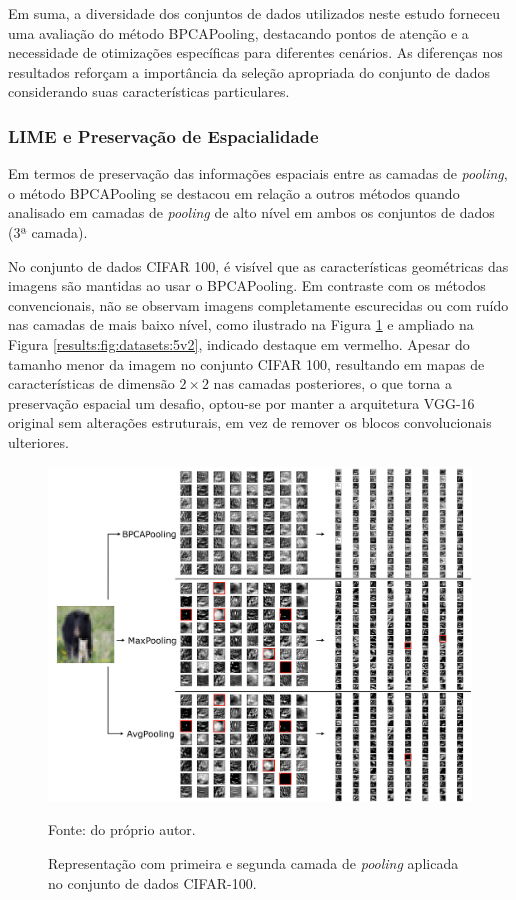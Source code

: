 Em suma, a diversidade dos conjuntos de dados utilizados neste estudo forneceu uma avaliação do método BPCAPooling, destacando pontos de atenção e a necessidade de otimizações específicas para diferentes cenários. As diferenças nos resultados reforçam a importância da seleção apropriada do conjunto de dados considerando suas características particulares.

\subsubsection{LIME e Preservação de Espacialidade}
\label{results:class:lime}
Em termos de preservação das informações espaciais entre as camadas de \textit{pooling}, o método BPCAPooling se destacou em relação a outros métodos quando analisado em camadas de \textit{pooling} de alto nível em ambos os conjuntos de dados (3ª camada).

No conjunto de dados CIFAR 100, é visível que as características geométricas das imagens são mantidas ao usar o BPCAPooling. Em contraste com os métodos convencionais, não se observam imagens completamente escurecidas ou com ruído nas camadas de mais baixo nível, como ilustrado na Figura \ref{results:fig:datasets:5} e ampliado na Figura \ref{results:fig:datasets:5v2}, indicado destaque em vermelho. Apesar do tamanho menor da imagem no conjunto CIFAR 100, resultando em mapas de características de dimensão $2 \times 2$ nas camadas posteriores, o que torna a preservação espacial um desafio, optou-se por manter a arquitetura VGG-16 original sem alterações estruturais, em vez de remover os blocos convolucionais ulteriores.

\begin{figure}[H]
    \centering
    \caption[Camadas de \textit{pooling} no CIFAR-100]{Representação com primeira e segunda camada de \textit{pooling} aplicada no conjunto de dados CIFAR-100.}
    \label{results:fig:datasets:5}
    \includegraphics[width=1\textwidth]{recursos/imagens/results/cifar_blocks.png}

    Fonte: do próprio autor.
\end{figure}


